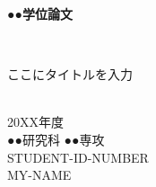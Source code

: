 \begin{titlepage}
	\begin{center}
		\begin{Large}
		\vspace{4cm}
		\begin{Huge}
			\textbf{●●学位論文}
		\end{Huge}\\
		\vspace{7cm}
		\begin{Huge}
			ここにタイトルを入力
		\end{Huge}\\
		\vspace{10cm}
		20XX年度\\
		●●研究科 ●●専攻\\
		\vspace{1cm}
		STUDENT-ID-NUMBER\\
		MY-NAME
		\end{Large}\\
	\end{center}
\end{titlepage}